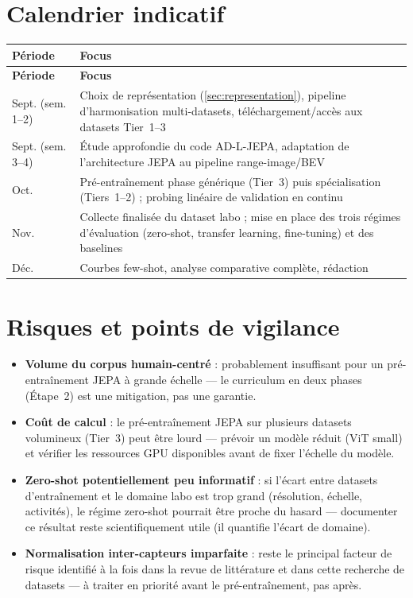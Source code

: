 \documentclass[11pt]{article}
\begin{document}
\section{Calendrier indicatif}

\begin{longtable}{P{3cm} P{11.5cm}}
\toprule
\textbf{Période} & \textbf{Focus} \\
\midrule
\endfirsthead
\toprule
\textbf{Période} & \textbf{Focus} \\
\midrule
\endhead

Sept. (sem. 1--2) & Choix de représentation (\ref{sec:representation}), pipeline
d'harmonisation multi-datasets, téléchargement/accès aux datasets Tier~1--3 \\
\addlinespace
Sept. (sem. 3--4) & Étude approfondie du code AD-L-JEPA, adaptation de l'architecture JEPA
au pipeline range-image/BEV \\
\addlinespace
Oct. & Pré-entraînement phase générique (Tier~3) puis spécialisation (Tiers~1--2) ;
probing linéaire de validation en continu \\
\addlinespace
Nov. & Collecte finalisée du dataset labo ; mise en place des trois régimes d'évaluation
(zero-shot, transfer learning, fine-tuning) et des baselines \\
\addlinespace
Déc. & Courbes few-shot, analyse comparative complète, rédaction \\

\bottomrule
\end{longtable}

\section{Risques et points de vigilance}

\begin{itemize}
    \item \textbf{Volume du corpus humain-centré} : probablement insuffisant pour un
    pré-entraînement JEPA à grande échelle --- le curriculum en deux phases (Étape~2) est une
    mitigation, pas une garantie.
    \item \textbf{Coût de calcul} : le pré-entraînement JEPA sur plusieurs datasets volumineux
    (Tier~3) peut être lourd --- prévoir un modèle réduit (ViT small) et vérifier les
    ressources GPU disponibles avant de fixer l'échelle du modèle.
    \item \textbf{Zero-shot potentiellement peu informatif} : si l'écart entre datasets
    d'entraînement et le domaine labo est trop grand (résolution, échelle, activités), le
    régime zero-shot pourrait être proche du hasard --- documenter ce résultat reste
    scientifiquement utile (il quantifie l'écart de domaine).
    \item \textbf{Normalisation inter-capteurs imparfaite} : reste le principal facteur de
    risque identifié à la fois dans la revue de littérature et dans cette recherche de
    datasets --- à traiter en priorité avant le pré-entraînement, pas après.
\end{itemize}
\end{document}
